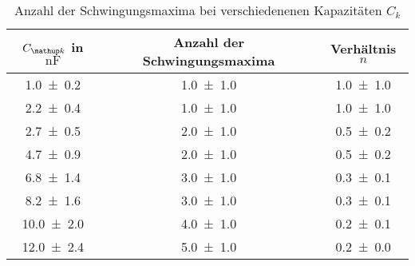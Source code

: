 \begin{table} 
\centering 
\caption{ Anzahl der Schwingungsmaxima bei verschiedenenen Kapazitäten $C_k$} 
\label{fig:teila_n_ck} 
\begin{tabular}{S S S } 
\toprule  
{$C\ua{k}$ in $\si{\nano\farad}$} & {Anzahl der Schwingungsmaxima} & {Verhältnis $n$}  \\ 
\midrule  
 \num{1.0\pm0.2} & \num{1.0\pm1.0} & \num{1.0\pm1.0}\\ 
\num{2.2\pm0.4} & \num{1.0\pm1.0} & \num{1.0\pm1.0}\\ 
\num{2.7\pm0.5} & \num{2.0\pm1.0} & \num{0.5\pm0.2}\\ 
\num{4.7\pm0.9} & \num{2.0\pm1.0} & \num{0.5\pm0.2}\\ 
\num{6.8\pm1.4} & \num{3.0\pm1.0} & \num{0.3\pm0.1}\\ 
\num{8.2\pm1.6} & \num{3.0\pm1.0} & \num{0.3\pm0.1}\\ 
\num{10.0\pm2.0} & \num{4.0\pm1.0} & \num{0.2\pm0.1}\\ 
\num{12.0\pm2.4} & \num{5.0\pm1.0} & \num{0.2\pm0.0}\\ 
\bottomrule 
\end{tabular} 
\end{table}

